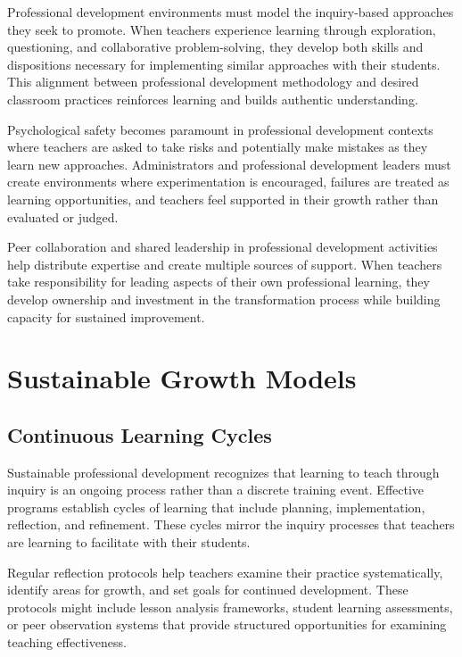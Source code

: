 \documentclass[
  Letterpaper,
]{scrbook}
\begin{document}
Professional development environments must model the inquiry-based
approaches they seek to promote. When teachers experience learning
through exploration, questioning, and collaborative problem-solving,
they develop both skills and dispositions necessary for implementing
similar approaches with their students. This alignment between
professional development methodology and desired classroom practices
reinforces learning and builds authentic understanding.

Psychological safety becomes paramount in professional development
contexts where teachers are asked to take risks and potentially make
mistakes as they learn new approaches. Administrators and professional
development leaders must create environments where experimentation is
encouraged, failures are treated as learning opportunities, and teachers
feel supported in their growth rather than evaluated or judged.

Peer collaboration and shared leadership in professional development
activities help distribute expertise and create multiple sources of
support. When teachers take responsibility for leading aspects of their
own professional learning, they develop ownership and investment in the
transformation process while building capacity for sustained
improvement.

\section{Sustainable Growth Models}\label{sustainable-growth-models}

\subsection{Continuous Learning
Cycles}\label{continuous-learning-cycles}

Sustainable professional development recognizes that learning to teach
through inquiry is an ongoing process rather than a discrete training
event. Effective programs establish cycles of learning that include
planning, implementation, reflection, and refinement. These cycles
mirror the inquiry processes that teachers are learning to facilitate
with their students.

Regular reflection protocols help teachers examine their practice
systematically, identify areas for growth, and set goals for continued
development. These protocols might include lesson analysis frameworks,
student learning assessments, or peer observation systems that provide
structured opportunities for examining teaching effectiveness.
\end{document}
